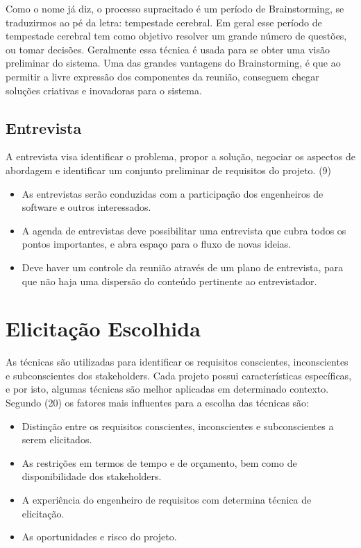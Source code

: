 Como o nome já diz, o processo supracitado é um período de Brainstorming, se traduzirmos ao pé da letra: tempestade cerebral. Em geral esse período de tempestade cerebral tem como objetivo resolver um grande número de questões, ou tomar decisões. Geralmente essa técnica é usada para se obter uma visão preliminar do sistema. Uma das grandes vantagens do Brainstorming, é que ao permitir a livre expressão dos componentes da reunião, conseguem chegar soluções criativas e inovadoras para o sistema.

\subsection{Entrevista}

A entrevista visa identificar o problema, propor a solução, negociar os aspectos de abordagem e identificar um conjunto preliminar  de requisitos do projeto. (9)

\begin{itemize}
\item As entrevistas serão conduzidas com a participação dos engenheiros de software e outros interessados.
\item A agenda de entrevistas deve possibilitar uma entrevista que cubra todos os pontos importantes,  e abra espaço para o fluxo de novas ideias.
\item Deve haver  um controle da reunião através de um plano de entrevista, para que não haja uma dispersão do conteúdo pertinente ao entrevistador.
\end{itemize}

\section{Elicitação Escolhida}

As técnicas são utilizadas para identificar os requisitos conscientes, inconscientes e subconscientes dos stakeholders. Cada projeto possui características específicas, e por isto, algumas técnicas são melhor aplicadas em determinado contexto. Segundo (20) os fatores mais influentes para a escolha das técnicas são:

\begin{itemize}
\item Distinção entre os requisitos conscientes, inconscientes e subconscientes a serem elicitados.
\item As restrições em termos de tempo e de orçamento, bem como de disponibilidade dos stakeholders.
\item A experiência do engenheiro de requisitos com determina técnica de elicitação.
\item As oportunidades e risco do projeto.
\end{itemize}

